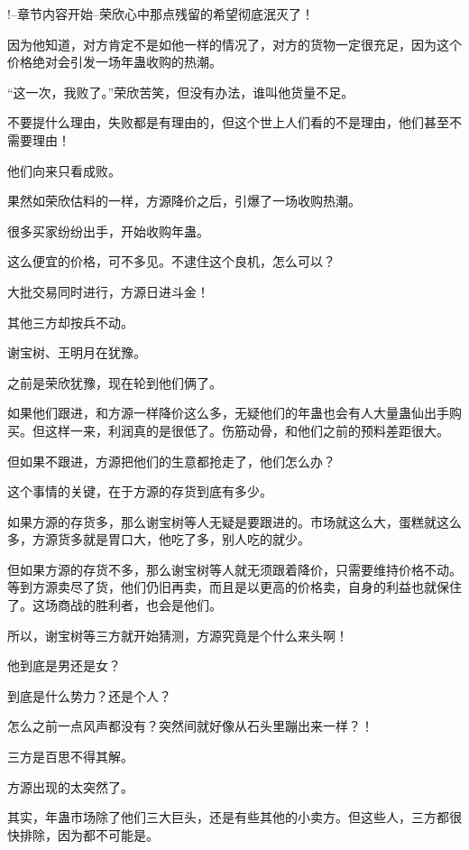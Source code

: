 
\begin{this_body}



!--章节内容开始--荣欣心中那点残留的希望彻底泯灭了！

因为他知道，对方肯定不是如他一样的情况了，对方的货物一定很充足，因为这个价格绝对会引发一场年蛊收购的热潮。

“这一次，我败了。”荣欣苦笑，但没有办法，谁叫他货量不足。

不要提什么理由，失败都是有理由的，但这个世上人们看的不是理由，他们甚至不需要理由！

他们向来只看成败。

果然如荣欣估料的一样，方源降价之后，引爆了一场收购热潮。

很多买家纷纷出手，开始收购年蛊。

这么便宜的价格，可不多见。不逮住这个良机，怎么可以？

大批交易同时进行，方源日进斗金！

其他三方却按兵不动。

谢宝树、王明月在犹豫。

之前是荣欣犹豫，现在轮到他们俩了。

如果他们跟进，和方源一样降价这么多，无疑他们的年蛊也会有人大量蛊仙出手购买。但这样一来，利润真的是很低了。伤筋动骨，和他们之前的预料差距很大。

但如果不跟进，方源把他们的生意都抢走了，他们怎么办？

这个事情的关键，在于方源的存货到底有多少。

如果方源的存货多，那么谢宝树等人无疑是要跟进的。市场就这么大，蛋糕就这么多，方源货多就是胃口大，他吃了多，别人吃的就少。

但如果方源的存货不多，那么谢宝树等人就无须跟着降价，只需要维持价格不动。等到方源卖尽了货，他们仍旧再卖，而且是以更高的价格卖，自身的利益也就保住了。这场商战的胜利者，也会是他们。

所以，谢宝树等三方就开始猜测，方源究竟是个什么来头啊！

他到底是男还是女？

到底是什么势力？还是个人？

怎么之前一点风声都没有？突然间就好像从石头里蹦出来一样？！

三方是百思不得其解。

方源出现的太突然了。

其实，年蛊市场除了他们三大巨头，还是有些其他的小卖方。但这些人，三方都很快排除，因为都不可能是。


\end{this_body}
